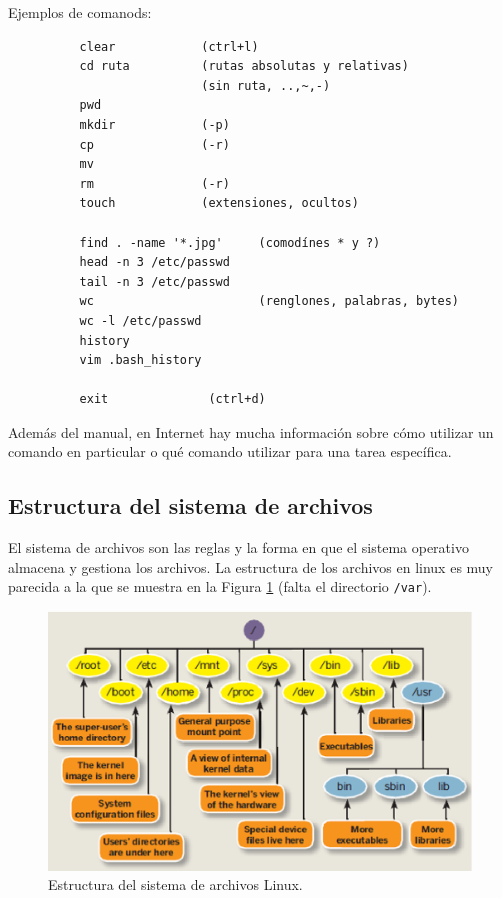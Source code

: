 \documentclass[12pt]{article}
\begin{document}
\newpage
Ejemplos de comanods:

\begin{verbatim}
          clear            (ctrl+l)
          cd ruta          (rutas absolutas y relativas)
                           (sin ruta, ..,~,-)
          pwd
          mkdir            (-p)
          cp               (-r)
          mv               
          rm               (-r)
          touch            (extensiones, ocultos)
          
          find . -name '*.jpg'     (comodínes * y ?)
          head -n 3 /etc/passwd
          tail -n 3 /etc/passwd
          wc                       (renglones, palabras, bytes)
          wc -l /etc/passwd
          history
          vim .bash_history
          
          exit              (ctrl+d)
\end{verbatim}

Además del manual, en Internet hay mucha información sobre cómo utilizar un comando en particular o qué comando utilizar para una tarea específica.

\subsection{Estructura del sistema de archivos}

El sistema de archivos son las reglas y la forma en que el sistema operativo almacena y gestiona los archivos. La estructura de los archivos en linux es muy parecida a la que se muestra en la Figura \ref{filesystem} (falta el directorio \texttt{/var}).

\begin{figure}[!ht]
\begin{center}
    \includegraphics[width=14cm]{imgs/filesystem.eps}
	\caption{Estructura del sistema de archivos Linux.}
	\label{filesystem}    
\end{center}
\end{figure}
\end{document}
